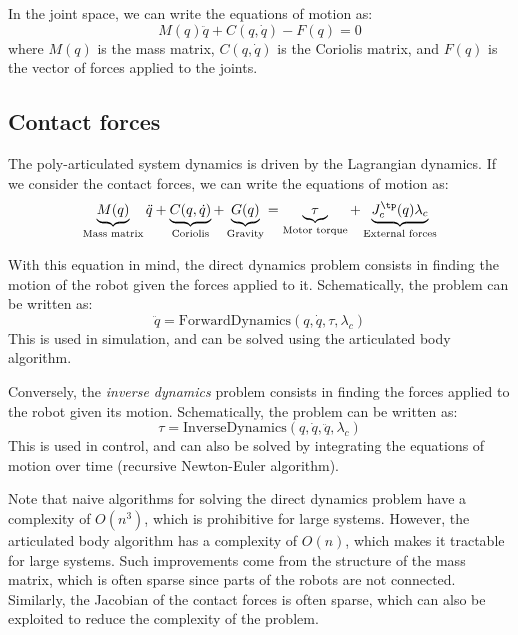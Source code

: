 In the joint space, we can write the equations of motion as:
\begin{equation}
    M(q)\ddot{q} + C(q, \dot{q}) - F(q) = 0
\end{equation}
where $M(q)$ is the mass matrix, $C(q, \dot{q})$ is the Coriolis matrix, and $F(q)$ is the vector of forces applied to the joints.

\subsection{Contact forces}
The poly-articulated system dynamics is driven by the Lagrangian dynamics. If we consider the contact forces, we can write the equations of motion as:
\begin{equation*}
    \underbrace{M(q)}_{\text{Mass matrix}}\ddot{q} + \underbrace{C(q, \dot{q})}_{\text{Coriolis}} + \underbrace{G(q)}_{\text{Gravity}} = \underbrace{\tau}_{\text{Motor torque}} + \underbrace{J_c^\tp(q)\lambda_c}_{\text{External forces}}
\end{equation*}

With this equation in mind, the direct dynamics problem consists in finding the motion of the robot given the forces applied to it. Schematically, the problem can be written as:
\begin{equation*}
    \ddot{q} = \text{ForwardDynamics}(q, \dot{q}, \tau, \lambda_c)
\end{equation*}
This is used in simulation, and can be solved using the articulated body algorithm.

Conversely, the \emph{inverse dynamics} problem consists in finding the forces applied to the robot given its motion. Schematically, the problem can be written as:
\begin{equation*}
    \tau = \text{InverseDynamics}(q, \dot{q}, \ddot{q}, \lambda_c)
\end{equation*}
This is used in control, and can also be solved by integrating the equations of motion over time (recursive Newton-Euler algorithm).

Note that naive algorithms for solving the direct dynamics problem have a complexity of $O(n^3)$, which is prohibitive for large systems. However, the articulated body algorithm has a complexity of $O(n)$, which makes it tractable for large systems. Such improvements come from the structure of the mass matrix, which is often sparse since parts of the robots are not connected. Similarly, the Jacobian of the contact forces is often sparse, which can also be exploited to reduce the complexity of the problem.

